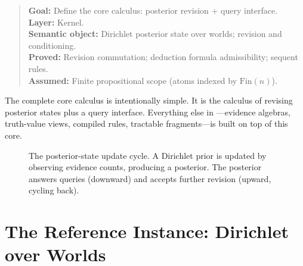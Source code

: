 \documentclass[11pt,openany]{report}
\begin{document}
\begin{quote}\small
\textbf{Goal:} Define the core calculus: posterior revision + query interface.\\
\textbf{Layer:} Kernel.\\
\textbf{Semantic object:} Dirichlet posterior state over worlds; revision and conditioning.\\
\textbf{Proved:} Revision commutation; deduction formula admissibility; sequent rules.\\
\textbf{Assumed:} Finite propositional scope (atoms indexed by $\mathrm{Fin}(n)$).
\end{quote}

The complete core calculus is intentionally simple.  It is the calculus of
revising posterior states plus a query interface.  Everything else in
\xiPLN{}---evidence algebras, truth-value views, compiled rules, tractable
fragments---is built on top of this core.

\begin{figure}[htbp]
\centering
{}
\caption{The posterior-state update cycle.  A Dirichlet prior is updated by
observing evidence counts, producing a posterior.  The posterior answers
queries (downward) and accepts further revision (upward, cycling back).}
\label{fig:posterior-update-cycle}
\end{figure}

\section{The Reference Instance: Dirichlet over Worlds}
\end{document}
